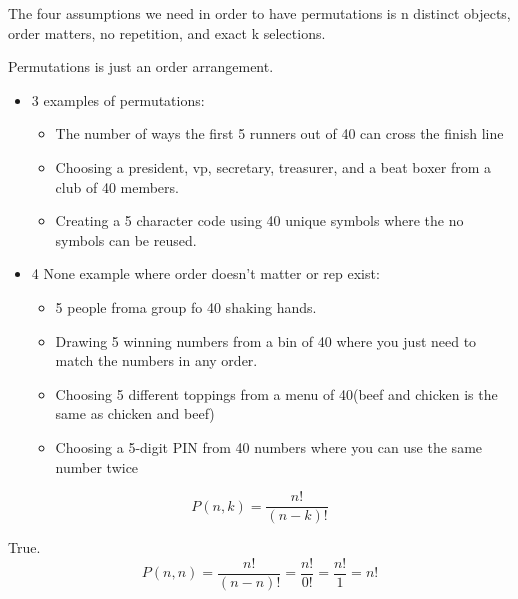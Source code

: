 \documentclass[12pt]{article}
\begin{document}
\begin{enumerate}


The four assumptions we need in order to have permutations is n distinct objects, order matters, no repetition, and exact k selections. 


Permutations is just an order arrangement. 

\newpage     
{}
\begin{itemize}
 

\item 3 examples of permutations:
\begin{itemize}
    \item The number of ways the first 5 runners out of 40 can cross the finish line
    \item Choosing a president, vp, secretary, treasurer, and a beat boxer from a club of 40 members.  
    \item Creating a 5 character code using 40 unique symbols where the no symbols can be reused.
\end{itemize}
\item 4 None example where order doesn't matter or rep exist:
\begin{itemize}
    \item 5 people froma  group fo 40 shaking hands.
    \item Drawing 5 winning numbers from a bin of 40 where you just need to match the numbers in any order.
    \item Choosing 5 different toppings from a menu of 40(beef and chicken is the same as chicken and beef)
    \item  Choosing a 5-digit PIN from 40 numbers where you can use the same number twice
\end{itemize}

\end{itemize}



\[ P(n, k) = \frac{n!}{(n - k)!} \]

True. \[ P(n, n) = \frac{n!}{(n - n)!}= \frac{n!}{0!}= \frac{n!}{1}= n! \]



\end{enumerate}
\end{document}
